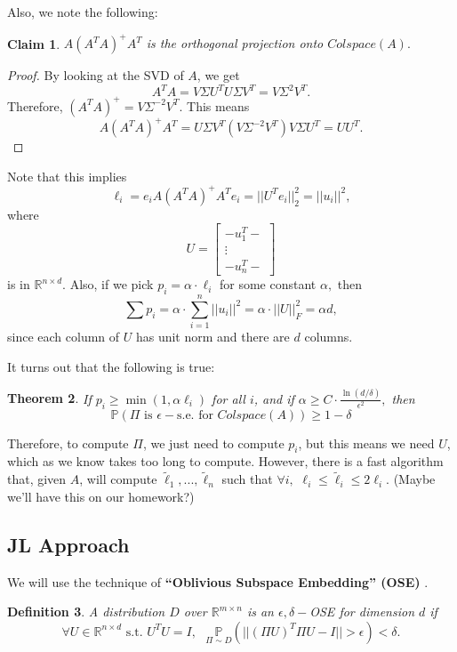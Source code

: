 \documentclass[11pt]{article}
\newtheorem{theorem}{Theorem}
\newtheorem{definition}[theorem]{Definition}
\newtheorem{claim}[theorem]{Claim}
\begin{document}
Also, we note the following:

\begin{claim}
    $A(A^TA)^+A^T$ is the orthogonal projection onto $Colspace(A).$
\end{claim}

\begin{proof}
    By looking at the SVD of $A$, we get $$A^T A = V \Sigma U^T U \Sigma V^T = V \Sigma^2 V^T.$$  Therefore, $(A^T A)^+ = V \Sigma^{-2} V^T.$  This means $$A(A^T A)^+ A^T = U \Sigma V^T (V \Sigma^{-2} V^T) V \Sigma U^T = U U^T.$$
\end{proof}

Note that this implies $$\ell_i = e_i A (A^T A)^+ A^T e_i = ||U^T e_i||_2^2 = ||u_i||^2,$$ where $$U = \begin{bmatrix} -u_1^T-\\ \vdots \\ -u_n^T- \end{bmatrix}$$ is in $\mathbb{R}^{n \times d}.$  Also, if we pick $p_i = \alpha \cdot \ell_i$ for some constant $\alpha,$ then $$\sum p_i = \alpha \cdot \sum\limits_{i = 1}^{n} ||u_i||^2 = \alpha \cdot ||U||_F^2 = \alpha d,$$ since each column of $U$ has unit norm and there are $d$ columns.

It turns out that the following is true:

\begin{theorem} \cite{SpielmanSrivastava}
    If $p_i \ge \min(1, \alpha \ell_i)$ for all $i$, and if $\alpha \ge C \cdot \frac{\ln (d/\delta)}{\epsilon^2},$ then $$\mathbb{P}(\Pi \text{ is } \epsilon-\text{s.e. for } Colspace(A)) \ge 1 - \delta$$
\end{theorem}

Therefore, to compute $\Pi$, we just need to compute $p_i$, but this means we need $U$, which as we know takes too long to compute.  However, there is a fast algorithm that, given $A$, will compute $\tilde{\ell}_1, ..., \tilde{\ell}_n$ such that $\forall i,$ $\ell_i \le \tilde{\ell}_i \le 2 \ell_i$.  (Maybe we'll have this on our homework?)

\subsection{JL Approach}

We will use the technique of \textbf{``Oblivious Subspace Embedding'' (OSE)} \cite{Sarlos}.

\begin{definition}
    A distribution $D$ over $\mathbb{R}^{m \times n}$ is an $\epsilon, \delta-$OSE for dimension $d$ if $$\forall U \in \mathbb{R}^{n \times d} \text{ s.t. } U^T U = I, \text{ } \mathbb{P}\limits_{\Pi \sim D} (||(\Pi U)^T\Pi U - I|| > \epsilon) < \delta.$$
\end{definition}
\end{document}
